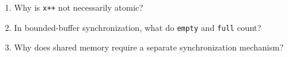 \begin{quickcheck}
\begin{enumerate}
  \item Why is \texttt{x++} not necessarily atomic?
  \item In bounded-buffer synchronization, what do \texttt{empty} and \texttt{full} count?
  \item Why does shared memory require a separate synchronization mechanism?
\end{enumerate}
\end{quickcheck}
